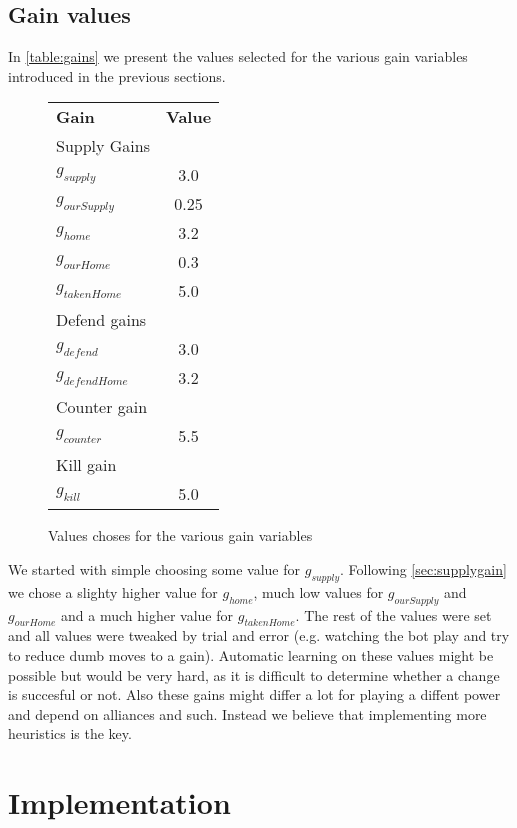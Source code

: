 \documentclass[a4paper]{article} %
\begin{document}
\subsection{Gain values}

In \autoref{table:gains} we present the values selected for the various gain variables introduced in the previous sections. 

\begin{figure}[H]
\centering
\begin{tabular}{| l | c |}
  \hline            
  {\bf Gain} & {\bf Value}\\
  {Supply Gains} &  \\
  $g_{supply}$ & 3.0 \\
  $g_{ourSupply}$ & 0.25 \\
  $g_{home}$ & 3.2 \\
  $g_{ourHome}$ & 0.3 \\
  $g_{takenHome}$ & 5.0 \\
  {Defend gains} &  \\
  $g_{defend}$ &  3.0 \\
  $g_{defendHome}$ & 3.2 \\
  {Counter gain} & \\
  $g_{counter}$ & 5.5 \\
  {Kill gain} & \\
  $g_{kill}$ & 5.0 \\
  \hline  
\end{tabular}
\caption{Values choses for the various gain variables}
\label{table:gains}
\end{figure}

We started with simple choosing some value for $g_{supply}$. Following \autoref{sec:supplygain} we chose a slighty higher value for $g_{home}$, much low values for $g_{ourSupply}$ and $g_{ourHome}$ and a much higher value for $g_{takenHome}$. The rest of the values were set and all values were tweaked by trial and error (e.g. watching the bot play and try to reduce dumb moves to a gain). Automatic learning on these values might be possible but would be very hard, as it is difficult to determine whether a change is succesful or not. Also these gains might differ a lot for playing a diffent power and depend on alliances and such. Instead we believe that implementing more heuristics is the key. 

\section{Implementation}
\end{document}
